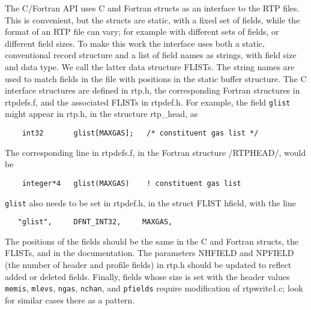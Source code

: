 \documentclass[11pt]{article}
\begin{document}
The C/Fortran API uses C and Fortran structs as an interface to the
RTP files.  This is convenient, but the structs are static, with a
fixed set of fields, while the format of an RTP file can vary; for
example with different sets of fields, or different field sizes.  To
make this work the interface uses both a static, conventional record
structure and a list of field names as strings, with field size and
data type.  We call the latter data structure FLISTs.  The string
names are used to match fields in the file with positions in the
static buffer structure.  The C interface structures are defined in
rtp.h, the corresponding Fortran structures in rtpdefs.f, and the
associated FLISTs in rtpdef.h.  For example, the field {\tt glist}
might appear in rtp.h, in the structure rtp\_head, as
\begin{verbatim}
    int32       glist[MAXGAS];   /* constituent gas list */
\end{verbatim}
\noindent 
The corresponding line in rtpdefs.f, in the Fortran structure
/RTPHEAD/, would be
\begin{verbatim}
    integer*4   glist(MAXGAS)    ! constituent gas list
\end{verbatim}
\noindent
{\tt glist} also needs to be set in rtpdef.h, in the struct FLIST
hfield, with the line
\begin{verbatim}
   "glist",     DFNT_INT32,     MAXGAS,
\end{verbatim}
\noindent
The positions of the fields should be the same in the C and
Fortran structs, the FLISTs, and in the documentation.  The
parameters NHFIELD and NPFIELD (the number of header and profile
fields) in rtp.h should be updated to reflect added or deleted
fields.  Finally, fields whose size is set with the header values
{\tt memis}, {\tt mlevs}, {\tt ngas}, {\tt nchan}, and {\tt pfields}
require modification of rtpwrite1.c; look for similar cases there as
a pattern.

\newpage
\end{document}
